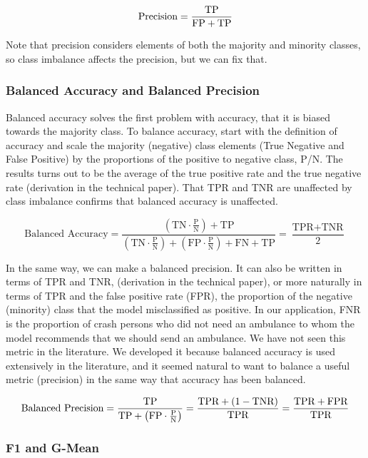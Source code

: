 $$\text{Precision} = \frac{ 
	\text{TP}
	}{
	\text{FP} 
	+ 
	\text{TP}
}$$

Note that precision considers elements of both the majority and minority classes, so class imbalance affects the precision, but we can fix that.  

\subsubsection{Balanced Accuracy and Balanced Precision}

Balanced accuracy solves the first problem with accuracy, that it is biased towards the majority class.  To balance accuracy, start with the definition of accuracy and scale the majority (negative) class elements (True Negative and False Positive) by the proportions of the positive to negative class, P/N.  The results turns out to be the average of the true positive rate and the true negative rate (derivation in the technical paper).  That TPR and TNR are unaffected by class imbalance confirms that balanced accuracy is unaffected.  

$$	\text{Balanced Accuracy} =  
\frac{ 
	\left(
		\text{TN} \cdot \frac{\text{P}}{\text{N}}
	\right)
	 + \text{TP}
}{
	\left(
		\text{TN} \cdot \frac{\text{P}}{\text{N}}
	\right)
	 + 
	 \left(
	 	\text{FP} \cdot \frac{\text{P}}{\text{N}}
	\right) 
	+ \text{FN} + \text{TP}
}
= \frac{\text{TPR} + \text{TNR}}{2}
$$



In the same way, we can make a balanced precision.  It can also be written in terms of TPR and TNR, (derivation in the technical paper), or more naturally in terms of TPR and the false positive rate (FPR), the proportion of the negative (minority) class that the model misclassified as positive.  In our application, FNR is the proportion of crash persons who did not need an ambulance to whom the model recommends that we should send an ambulance. We have not seen this metric in the literature.  We developed it because balanced accuracy is used extensively in the literature, and it seemed natural to want to balance a useful metric (precision) in the same way that accuracy has been balanced.

$$\text{Balanced Precision} 
= \frac{\text{TP}}{\text{TP} +  \left( \text{FP} \cdot \frac{\text P}{\text N}\right) }
= \frac{\text{TPR} + (1 - \text{TNR})}{\text{TPR}} 
= \frac{\text{TPR} + \text{FPR}}{\text{TPR}} 
$$


\subsubsection{F1 and G-Mean}

